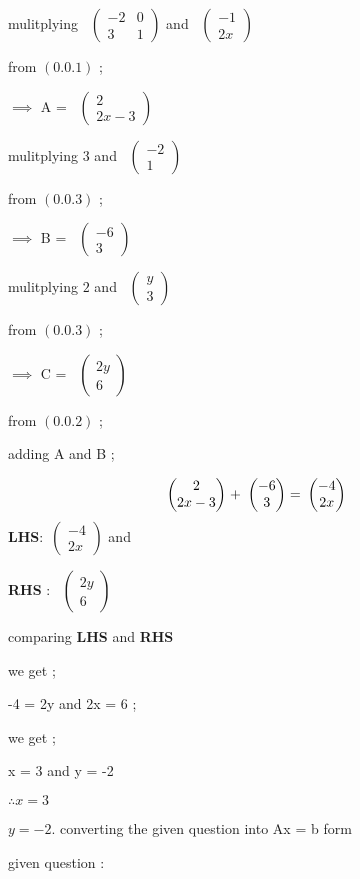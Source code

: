 \documentclass[journal,12pt,twocolumn]{IEEEtran}
\theoremstyle{remark}
\newcommand{\myvec}[1]{\ensuremath{\begin{pmatrix}#1\end{pmatrix}}}
\numberwithin{equation}{subsection}
\begin{document}
   mulitplying \ \myvec{-2 & 0 \\3 & 1 } 
      and 
      \ \myvec{-1 \\2x }
      
     from $(0.0.1)$ ;
      
      $\implies$  A = \ \myvec{2 \\2x-3 } 
      
    mulitplying 
    $3$ and
       \ \myvec{-2 \\1 } 
      
     from $(0.0.3)$ ;
      
       $\implies$  B = \ \myvec{-6 \\3 } 
       
       mulitplying 
    $2$ and  
\ \myvec{y \\ 3 } 

      
     from $(0.0.3)$ ;
      
       $\implies$  C = 
\ \myvec{2y \\6 } 
      
      from $(0.0.2)$ ; 
      
      adding A and B ;
       
     \begin{align}
&\ \myvec{2\\2x-3 }& \hspace{-0.25cm} +
&\ \myvec{-6\\3} & \hspace{-0.25cm}= 
&\ \myvec{-4\\2x} &
\end{align} 
      \newpage
\textbf{LHS}:\ \myvec{-4 \\2x } 
      and \hspace{3cm}
     
  \textbf {RHS} : 
\ \myvec{2y \\6 } 
      
      
      comparing \textbf{LHS} and \textbf{RHS}
      
      we get ;
      
      -4 = 2y and 2x = 6 ;
      
      we get ;
      
      x = 3 and y = -2 
      
  $ \therefore x = 3 $
     
                 $   y = -2 $.
     \newpage
     \large
   converting the given question into Ax = b form 
   
   given question :
   
\end{document}
